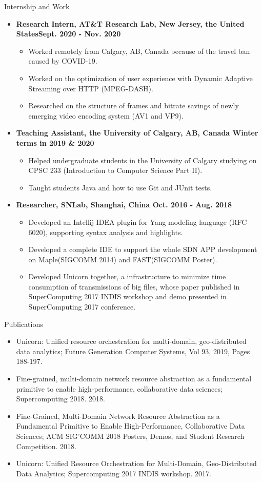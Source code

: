 \documentclass[10pt,oneside]{article}
\newenvironment{ressection}[1]{
	\vspace{4pt}
	{\fontfamily{phv}\selectfont\Large#1}
	\begin{itemize}
	\vspace{3pt}
}{
	\end{itemize}
}
\newcommand{\resitem}[1]{
	\vspace{-4pt}
	\item \begin{flushleft} #1 \end{flushleft}
}
\newcommand{\ressubitem}[1]{
	\vspace{-1pt}
	\item \begin{flushleft} #1 \end{flushleft}
}
\newenvironment{reslist}[1]{
	\resitem{\textbf{#1}}
	\vspace{-5pt}
	\begin{itemize}
}{
	\end{itemize}
}
\begin{document}
\begin{ressection}{Internship and Work}
	\begin{reslist}{Research Intern, AT\&T Research Lab, New Jersey, the United States\hfill Sept. 2020 - Nov. 2020}
		\ressubitem{Worked remotely from Calgary, AB, Canada because of the travel ban caused by COVID-19.}
		\ressubitem{Worked on the optimization of user experience with Dynamic Adaptive Streaming over HTTP (MPEG-DASH).}
		\ressubitem{Researched on the structure of frames and bitrate savings of newly emerging video encoding system (AV1 and VP9).}
	\end{reslist}
	\begin{reslist}{Teaching Assistant, the University of Calgary, AB, Canada \hfill Winter terms in 2019 \& 2020}
		\ressubitem{Helped undergraduate students in the University of
			Calgary studying on CPSC 233 (Introduction to Computer Science Part
			II). }
		\ressubitem{Taught students Java and how to use Git and JUnit tests.}
	\end{reslist}
	\begin{reslist}{Researcher, SNLab, Shanghai, China \hfill Oct. 2016 - Aug. 2018}
		\ressubitem{Developed an Intellij IDEA plugin for Yang modeling language (RFC 6020), supporting syntax analysis and highlights.}
		\ressubitem{Developed a complete IDE to support the whole SDN APP development on Maple(SIGCOMM 2014) and FAST(SIGCOMM Poster).}
		\ressubitem{Developed Unicorn together, a infrastructure to minimize time
			consumption of transmissions of big files, whose paper published in
			SuperComputing 2017 INDIS workshop and demo presented in SuperComputing
			2017 conference. }
	\end{reslist}
\end{ressection}

\begin{ressection}{Publications}
	\ressubitem{Unicorn: Unified resource orchestration for multi-domain, geo-distributed data analytics; Future Generation Computer Systems, Vol 93, 2019, Pages 188-197.}
	\ressubitem{Fine-grained, multi-domain network resource abstraction as a
		fundamental primitive to enable high-performance, collaborative data
		sciences; Supercomputing 2018. 2018. }
	\ressubitem{Fine-Grained, Multi-Domain Network Resource Abstraction as a Fundamental Primitive to Enable High-Performance, Collaborative Data Sciences; ACM SIG’COMM 2018 Posters, Demos, and Student Research Competition. 2018.}
	\ressubitem{Unicorn: Unified Resource Orchestration for Multi-Domain, Geo-Distributed Data Analytics; Supercomputing 2017 INDIS workshop. 2017.}
\end{ressection}
\end{document}
